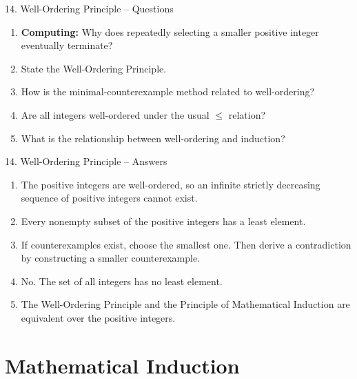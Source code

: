\documentclass[aspectratio=169,11pt]{beamer}
\begin{document}
\begin{frame}{14. Well-Ordering Principle -- Questions}

\begin{enumerate}
\item \textbf{Computing:} Why does repeatedly selecting a smaller positive integer eventually terminate?

\item State the Well-Ordering Principle.

\item How is the minimal-counterexample method related to well-ordering?

\item Are all integers well-ordered under the usual $\leq$ relation?

\item What is the relationship between well-ordering and induction?
\end{enumerate}

\end{frame}

\begin{frame}{14. Well-Ordering Principle -- Answers}

\begin{enumerate}
\item The positive integers are well-ordered, so an infinite strictly decreasing sequence of positive integers cannot exist.

\item Every nonempty subset of the positive integers has a least element.

\item If counterexamples exist, choose the smallest one. Then derive a contradiction by constructing a smaller counterexample.

\item No. The set of all integers has no least element.

\item The Well-Ordering Principle and the Principle of Mathematical Induction are equivalent over the positive integers.
\end{enumerate}

\end{frame}


\section{Mathematical Induction}
\end{document}
